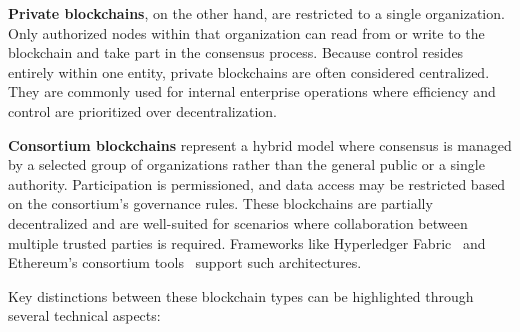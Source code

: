 \textbf{Private blockchains}, on the other hand, are restricted to a single organization. Only authorized nodes within that organization can read from or write to the blockchain and take part in the consensus process. Because control resides entirely within one entity, private blockchains are often considered centralized. They are commonly used for internal enterprise operations where efficiency and control are prioritized over decentralization.

\textbf{Consortium blockchains} represent a hybrid model where consensus is managed by a selected group of organizations rather than the general public or a single authority. Participation is permissioned, and data access may be restricted based on the consortium’s governance rules. These blockchains are partially decentralized and are well-suited for scenarios where collaboration between multiple trusted parties is required. Frameworks like Hyperledger Fabric~\cite{hyperledger2015} and Ethereum’s consortium tools~\cite{ethereum2015consortium} support such architectures.

Key distinctions between these blockchain types can be highlighted through several technical aspects:

